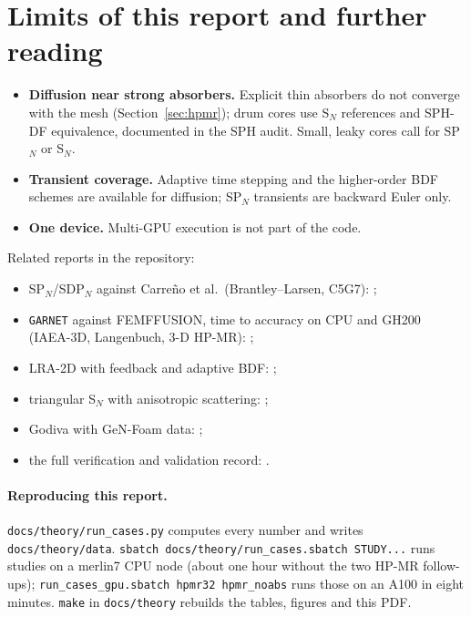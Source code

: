 \documentclass[a4paper,10pt]{article}
\newcommand{\garnet}{\texttt{GARNET}}
\newcommand{\code}[1]{\texttt{#1}}
\begin{document}
\section{Limits of this report and further reading}
\label{sec:further}

\begin{itemize}
\item \textbf{Diffusion near strong absorbers.} Explicit thin absorbers do not
  converge with the mesh (Section~\ref{sec:hpmr}); drum cores use S$_N$ references
  and SPH-DF equivalence, documented in the SPH audit. Small, leaky cores call for
  SP$_N$ or S$_N$.
\item \textbf{Transient coverage.} Adaptive time stepping and the higher-order BDF
  schemes are available for diffusion; SP$_N$ transients are backward Euler only.
\item \textbf{One device.} Multi-GPU execution is not part of the code.
\end{itemize}

Related reports in the repository:
\begin{itemize}
\item SP$_N$/SDP$_N$ against Carre\~no et al.\ (Brantley--Larsen, C5G7):
  ;
\item \garnet{} against FEMFFUSION, time to accuracy on CPU and GH200 (IAEA-3D,
  Langenbuch, 3-D HP-MR):
  ;
\item LRA-2D with feedback and adaptive BDF:
  ;
\item triangular S$_N$ with anisotropic scattering:
  ;
\item Godiva with GeN-Foam data: ;
\item the full verification and validation record: .
\end{itemize}

\paragraph{Reproducing this report.} \code{docs/theory/run\_cases.py} computes every
number and writes \code{docs/theory/data}. \code{sbatch docs/theory/run\_cases.sbatch
STUDY...} runs studies on a merlin7 CPU node (about one hour without the two HP-MR
follow-ups); \code{run\_cases\_gpu.sbatch hpmr32 hpmr\_noabs} runs those on an A100
in eight minutes. \code{make} in \code{docs/theory} rebuilds the tables, figures
and this PDF.
\end{document}
